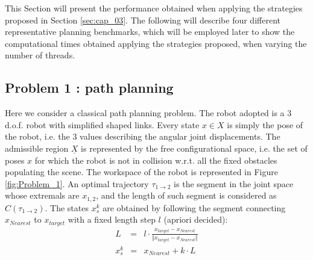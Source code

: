 
This Section will present the performance obtained when applying the strategies proposed in Section \ref{sec:cap_03}. The following will describe four different representative planning benchmarks, which will be employed later to show the computational times obtained applying the strategies proposed, when varying the number of threads.

\subsection{Problem 1 : path planning}
\label{sec:probl_1}

Here we consider a classical path planning problem. The robot adopted is a 3 d.o.f. robot with simplified shaped links. Every state $x \in X$ is simply the pose of the robot, i.e. the 3 values describing the angular joint displacements. The admissible region $\underline{X}$ is represented by the free configurational  space, i.e. the set of poses $x$ for which the robot is not in collision w.r.t. all the fixed obstacles populating the scene. The workspace of the robot is represented in Figure \ref{fig:Problem_1}.
An optimal trajectory $\tau_{1 \rightarrow 2}$ is the segment in the joint space whose extremals are $x_{1,2}$, and the length of such segment is considered as $C(\tau_{1 \rightarrow 2})$.
The states $x^k_s$ are obtained  by following the segment connecting $x_{Nearest}$ to $x_{target}$ with a fixed length step $l$ (apriori decided):
\begin{eqnarray}
L &=& l \cdot \frac{x_{target}-x_{Nearest}}{\Vert x_{target}-x_{Nearest} \Vert} \nonumber\\
x^k_s &=& x_{Nearest} + k \cdot L
\end{eqnarray}

